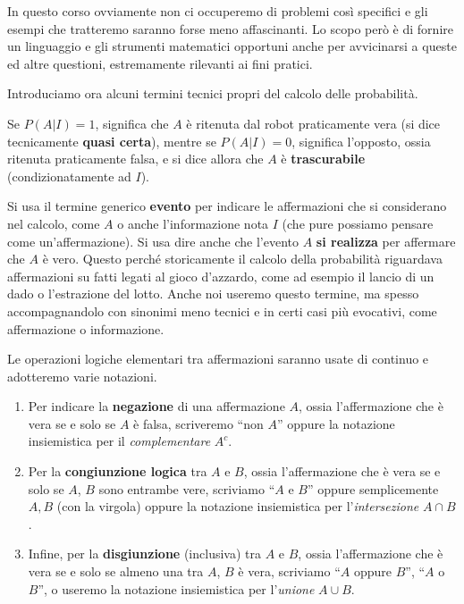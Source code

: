 \documentclass[
  italian,
  letterpaper,
]{book}
\theoremstyle{definition}
\theoremstyle{remark}
\begin{document}
In questo corso ovviamente non ci occuperemo di problemi così specifici
e gli esempi che tratteremo saranno forse meno affascinanti. Lo scopo
però è di fornire un linguaggio e gli strumenti matematici opportuni
anche per avvicinarsi a queste ed altre questioni, estremamente
rilevanti ai fini pratici.

Introduciamo ora alcuni termini tecnici propri del calcolo delle
probabilità.

Se \(P(A|I) = 1\), significa che \(A\) è ritenuta dal robot praticamente
vera (si dice tecnicamente \textbf{quasi certa}), mentre se
\(P(A|I) = 0\), significa l'opposto, ossia ritenuta praticamente falsa,
e si dice allora che \(A\) è \textbf{trascurabile} (condizionatamente ad
\(I\)).

Si usa il termine generico \textbf{evento} per indicare le affermazioni
che si considerano nel calcolo, come \(A\) o anche l'informazione nota
\(I\) (che pure possiamo pensare come un'affermazione). Si usa dire
anche che l'evento \(A\) \textbf{si realizza} per affermare che \(A\) è
vero. Questo perché storicamente il calcolo della probabilità riguardava
affermazioni su fatti legati al gioco d'azzardo, come ad esempio il
lancio di un dado o l'estrazione del lotto. Anche noi useremo questo
termine, ma spesso accompagnandolo con sinonimi meno tecnici e in certi
casi più evocativi, come affermazione o informazione.

Le operazioni logiche elementari tra affermazioni saranno usate di
continuo e adotteremo varie notazioni.

\begin{enumerate}
\def\labelenumi{\arabic{enumi}.}
\item
  Per indicare la \textbf{negazione} di una affermazione \(A\), ossia
  l'affermazione che è vera se e solo se \(A\) è falsa, scriveremo ``non
  \(A\)'' oppure la notazione insiemistica per il \emph{complementare}
  \(A^c\).
\item
  Per la \textbf{congiunzione logica} tra \(A\) e \(B\), ossia
  l'affermazione che è vera se e solo se \(A\), \(B\) sono entrambe
  vere, scriviamo ``\(A\) e \(B\)'' oppure semplicemente \(A,B\) (con la
  virgola) oppure la notazione insiemistica per l'\emph{intersezione}
  \(A\cap B\).
\item
  Infine, per la \textbf{disgiunzione} (inclusiva) tra \(A\) e \(B\),
  ossia l'affermazione che è vera se e solo se almeno una tra \(A\),
  \(B\) è vera, scriviamo ``\(A\) oppure \(B\)'', ``\(A\) o \(B\)'', o
  useremo la notazione insiemistica per l'\emph{unione} \(A \cup B\).
\end{enumerate}
\end{document}
